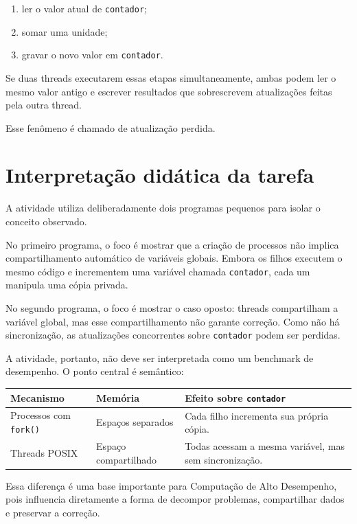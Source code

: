 \begin{enumerate}
    \item ler o valor atual de \texttt{contador};
    \item somar uma unidade;
    \item gravar o novo valor em \texttt{contador}.
\end{enumerate}

Se duas threads executarem essas etapas simultaneamente, ambas podem ler o mesmo valor antigo e escrever resultados que sobrescrevem atualizações feitas pela outra thread.

Esse fenômeno é chamado de atualização perdida.

\section{Interpretação didática da tarefa}
\label{sec:atvd03-interpretacao}

A atividade utiliza deliberadamente dois programas pequenos para isolar o conceito observado.

No primeiro programa, o foco é mostrar que a criação de processos não implica compartilhamento automático de variáveis globais. Embora os filhos executem o mesmo código e incrementem uma variável chamada \texttt{contador}, cada um manipula uma cópia privada.

No segundo programa, o foco é mostrar o caso oposto: threads compartilham a variável global, mas esse compartilhamento não garante correção. Como não há sincronização, as atualizações concorrentes sobre \texttt{contador} podem ser perdidas.

A atividade, portanto, não deve ser interpretada como um benchmark de desempenho. O ponto central é semântico:

\begin{center}
\begin{tabular}{|p{}|p{}|p{}|}
\hline
\textbf{Mecanismo} & \textbf{Memória} & \textbf{Efeito sobre \texttt{contador}} \\
\hline
Processos com \texttt{fork()} &
Espaços separados &
Cada filho incrementa sua própria cópia. \\
\hline
Threads POSIX &
Espaço compartilhado &
Todas acessam a mesma variável, mas sem sincronização. \\
\hline
\end{tabular}
\end{center}

Essa diferença é uma base importante para Computação de Alto Desempenho, pois influencia diretamente a forma de decompor problemas, compartilhar dados e preservar a correção.

